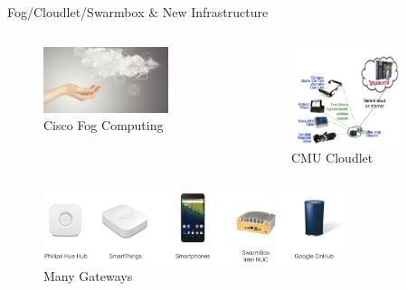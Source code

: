 \begin{frame}{Fog/Cloudlet/Swarmbox \& New Infrastructure}
  \begin{columns}
    \begin{figure}
      \includegraphics[width=0.8\textwidth]{figures/fog.png}
      \captionsetup{labelformat=empty}
      \caption{Cisco Fog Computing}
    \end{figure}
    \pause
    \begin{figure}
      \includegraphics[width=0.8\textwidth]{figures/cloudlet.png}
      \captionsetup{labelformat=empty}
      \caption{CMU Cloudlet}
    \end{figure}
  \end{columns}
  \pause
  \begin{figure}
    \includegraphics[width=0.8\textwidth]{figures/gateways.png}
    \captionsetup{labelformat=empty}
    \caption{Many Gateways}
  \end{figure}
\end{frame}

